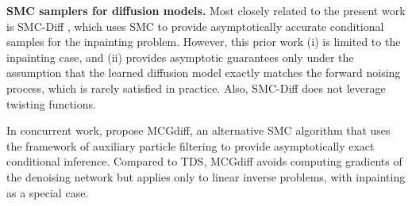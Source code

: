 \textbf{SMC samplers for diffusion models.}
Most closely related to the present work is SMC-Diff \citep{trippe2022diffusion},
which uses SMC to provide asymptotically accurate conditional samples for the inpainting problem.
However, this prior work 
(i) is limited to the inpainting case, and
(ii) provides asymptotic guarantees only under the assumption that the learned diffusion model exactly matches the forward noising process, which is rarely satisfied in practice.
Also, SMC-Diff does not leverage twisting functions.

In concurrent work, \citet{cardoso2023monte} propose MCGdiff, an alternative SMC algorithm that uses the framework of auxiliary particle filtering \citep{pitt1999filtering} to provide asymptotically exact conditional inference.  Compared to TDS, MCGdiff avoids computing gradients of the denoising network but applies only to linear inverse problems, with inpainting as a special case.

